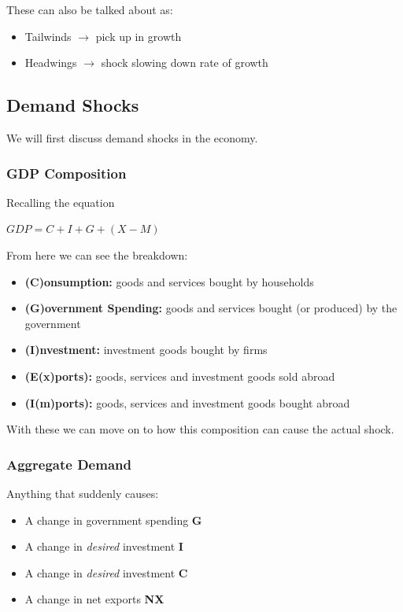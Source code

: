 \documentclass[12pt, letterpaper]{article}
\begin{document}
These can also be talked about as:
\begin{itemize}
	\item Tailwinds $\rightarrow$ pick up in growth
	\item Headwings $\rightarrow$ shock slowing down rate of growth
\end{itemize}

\subsection{Demand Shocks}
We will first discuss demand shocks in the economy.

\subsubsection{GDP Composition}
Recalling the equation
\begin{center}

$ GDP = C + I + G + (X-M)$

\end{center}

From here we can see the breakdown:
\begin{itemize}
	\item \textbf{(C)onsumption:} goods and services bought by households
	\item \textbf{(G)overnment Spending:} goods and services bought (or produced) by the government
	\item \textbf{(I)nvestment:} investment goods bought by firms
	\item \textbf{(E(x)ports):} goods, services and investment goods sold abroad
	\item \textbf{(I(m)ports):} goods, services and investment goods bought abroad
\end{itemize}

With these we can move on to how this composition can cause the actual shock.

\subsubsection{Aggregate Demand}
Anything that suddenly causes:
\begin{itemize}
	\item A change in government spending \textbf{G}
	\item A change in \textit{desired} investment \textbf{I}
	\item A change in \textit{desired} investment \textbf{C}
	\item A change in net exports \textbf{NX}
\end{itemize}
\end{document}
